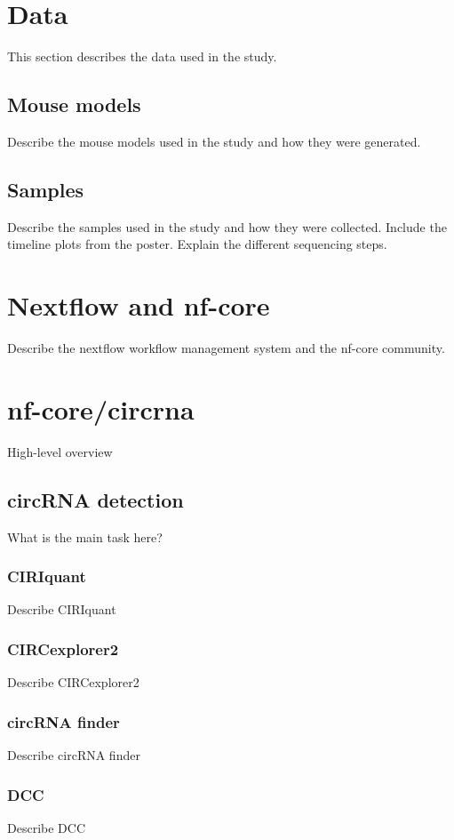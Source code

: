 \section{Data}
This section describes the data used in the study.

\subsection{Mouse models}
Describe the mouse models used in the study and how they were generated.

\subsection{Samples}
Describe the samples used in the study and how they were collected.
Include the timeline plots from the poster.
Explain the different sequencing steps.

\section{Nextflow and nf-core}
Describe the nextflow workflow management system and the nf-core community.

\section{nf-core/circrna}
High-level overview

\subsection{circRNA detection}
What is the main task here?

\subsubsection{CIRIquant}
Describe CIRIquant

\subsubsection{CIRCexplorer2}
Describe CIRCexplorer2

\subsubsection{circRNA finder}
Describe circRNA finder

\subsubsection{DCC}
Describe DCC


